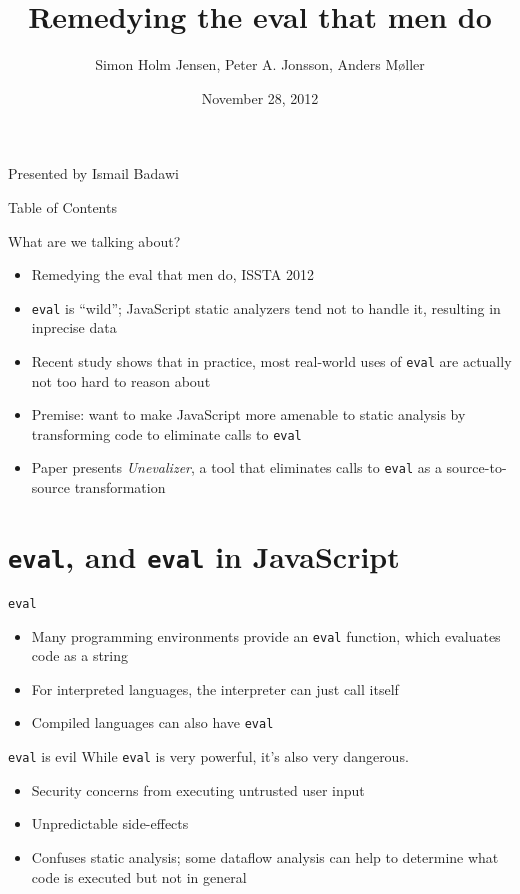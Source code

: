 \documentclass{beamer}
\title[Remedying the eval that men do]
{Remedying the eval that men do}
\date{November 28, 2012}
\author[Jensen et al.]{Simon Holm Jensen, Peter A. Jonsson, Anders M{\o}ller}
\begin{document}

\begin{frame}
\nocite{Remedying}
\nocite{Eval}
\titlepage
\begin{center}
Presented by Ismail Badawi
\end{center}
\end{frame}

\begin{frame}{Table of Contents}
\tableofcontents
\end{frame}

\begin{frame}{What are we talking about?}
\begin{itemize}
\item Remedying the eval that men do, ISSTA 2012
\item {\tt eval} is ``wild''; JavaScript static analyzers tend not to
handle it, resulting in inprecise data
\item Recent study shows that in practice, most real-world uses of
{\tt eval} are actually not too hard to reason about
\item Premise: want to make JavaScript more amenable to static analysis
by transforming code to eliminate calls to {\tt eval}
\item Paper presents \emph{Unevalizer}, a tool that eliminates calls
to {\tt eval} as a source-to-source transformation
\end{itemize}
\end{frame}

\section{{\tt eval}, and {\tt eval} in JavaScript}
\begin{frame}{{\tt eval}}
\begin{itemize}
\item Many programming environments provide an {\tt eval}
function, which evaluates code as a string
\item For interpreted languages, the interpreter can just call itself
\item Compiled languages can also have {\tt eval}
\end{itemize}
\end{frame}

\begin{frame}{{\tt eval} is evil}
While {\tt eval} is very powerful, it's also very dangerous.
\begin{itemize}
\item Security concerns from executing untrusted user input
\item Unpredictable side-effects
\item Confuses static analysis; some dataflow analysis can help to
determine what code is executed but not in general
\end{itemize}
\end{frame}
\end{document}
